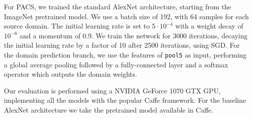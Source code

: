 \documentclass{article}
\begin{document}
For PACS, we trained the standard AlexNet architecture, starting from the ImageNet pretrained model. We use a batch size of 192, with 64 samples for each source domain. The initial learning rate is set to $5\cdot10^{-4}$ with a weight decay of $10^{-6}$ and a momentum of 0.9. We train the network for 3000 iterations, decaying the initial learning rate by a factor of 10 after 2500 iterations, using SGD. For the domain prediction branch, we use the features of \texttt{pool5} as input, performing a global average pooling followed by a fully-connected layer and a softmax operator which outputs the domain weights.

Our evaluation is performed using a NVIDIA GeForce 1070 GTX GPU, implementing all the models with the popular Caffe \cite{jia2014caffe} framework. For the baseline AlexNet architecture we take the pretrained model available in Caffe.
\end{document}
